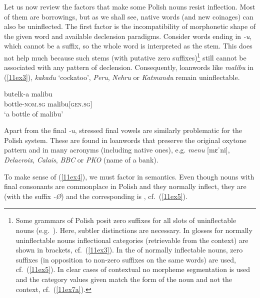 \documentclass[output=paper,colorlinks,citecolor=brown]{langscibook}
\begin{document}
Let us now review the factors that make some Polish nouns resist inflection. Most of them are borrowings, but as we shall see, native words (and new coinages) can also be uninflected. The first factor is the incompatibility of morphonetic shape of the given word and available declension paradigms. Consider words ending in \emph{-u}, which cannot be a  suffix, so the whole word is interpreted as the stem. This does not help much because such stems (with putative zero suffixes)\footnote{Some grammars of Polish posit zero suffixes for all  slots of uninflectable nouns (e.g.~\citealt[271]{orzechowska1998}). Here, subtler distinctions are necessary. In glosses for normally uninflectable nouns inflectional categories (retrievable from the context) are shown in brackets, cf.~(\ref{11ex3}). In the  of normally inflectable nouns, zero suffixes (in opposition to non-zero suffixes on the same words) are used, cf.~(\ref{11ex5}). In clear cases of contextual  no morpheme segmentation is used and the category values given match the form of the noun and not the context, cf.~(\ref{11ex7a}).} still cannot be associated with any pattern of declension. Consequently, loanwords like \emph{malibu} in (\ref{11ex3}), \emph{kakadu} `cockatoo', \emph{Peru}, \emph{Nehru} or \emph{Katmandu} remain uninflectable.

\begin{exe}
	\ex \label{11ex3}
	\gll butelk-a malibu \\
	bottle-\textsc{nom.sg} malibu[\textsc{gen.sg}] \\
	\trans ‘a bottle of malibu’
\end{exe}

Apart from the final \emph{-u}, stressed final vowels are similarly problematic for the Polish system. These are found in loanwords that preserve the original oxytone pattern and in many acronyms (including native ones), e.g. \emph{menu} [mɛˈni], \emph{Delacroix}, \emph{Calais}, \emph{BBC} or \emph{PKO} (name of a bank).

To make sense of (\ref{11ex4}), we must factor in semantics. Even though nouns with final consonants are commonplace in Polish and they normally inflect, they are  (with the suffix \emph{-Ø}) and the corresponding  is , cf.~(\ref{11ex5}).
\end{document}
